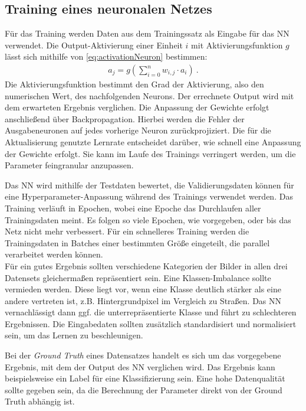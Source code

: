 \subsection{Training eines neuronalen Netzes}

Für das Training werden Daten aus dem Trainingssatz als Eingabe für das \ac{NN} verwendet.
Die Output-Aktivierung einer Einheit $i$ mit Aktivierungsfunktion $g$ lässt sich mithilfe von \autoref{eq:activationNeuron} bestimmen:
\begin{align}
	\label{eq:activationNeuron} a_j = g(\sum_{i = 0}^{n}w_{i,j} \cdot a_i) ~.
\end{align}
Die Aktivierungsfunktion bestimmt den Grad der Aktivierung, also den numerischen Wert, des nachfolgenden Neurons.
Der errechnete Output wird mit dem erwarteten Ergebnis verglichen.
Die Anpassung der Gewichte erfolgt anschließend über Backpropagation.
Hierbei werden die Fehler der Ausgabeneuronen auf jedes vorherige Neuron zurückprojiziert.
Die für die Aktualisierung genutzte Lernrate entscheidet darüber, wie schnell eine Anpassung der Gewichte erfolgt.
Sie kann im Laufe des Trainings verringert werden, um die Parameter feingranular anzupassen.

Das \ac{NN} wird mithilfe der Testdaten bewertet, die Validierungsdaten können für eine Hyperparameter-Anpassung während des Trainings
verwendet werden. Das Training verläuft in Epochen, wobei eine Epoche das Durchlaufen aller Trainingsdaten meint. 
Es folgen so viele Epochen, wie vorgegeben, oder bis das Netz nicht mehr verbessert. Für ein schnelleres Training werden die 
Trainingsdaten in Batches einer bestimmten Größe eingeteilt, die parallel verarbeitet werden können. \\  
Für ein gutes Ergebnis sollten verschiedene Kategorien der Bilder in allen drei Datensets gleichermaßen repräsentiert sein.
Eine Klassen-Imbalance sollte vermieden werden.
Diese liegt vor, wenn eine Klasse deutlich stärker als eine andere vertreten ist, z.B. Hintergrundpixel im Vergleich zu Straßen.
Das \ac{NN} vernachlässigt dann ggf. die unterrepräsentierte Klasse und führt zu schlechteren Ergebnissen.
Die Eingabedaten sollten zusätzlich standardisiert und normalisiert sein, um das Lernen zu beschleunigen. 

Bei der \textit{Ground Truth} eines Datensatzes handelt es sich um das vorgegebene Ergebnis, mit dem der Output des \ac{NN}	verglichen wird.
Das Ergebnis kann beispielsweise ein Label für eine Klassifizierung sein.
Eine hohe Datenqualität sollte gegeben sein, da die Berechnung der Parameter direkt von der Ground Truth abhängig ist.

